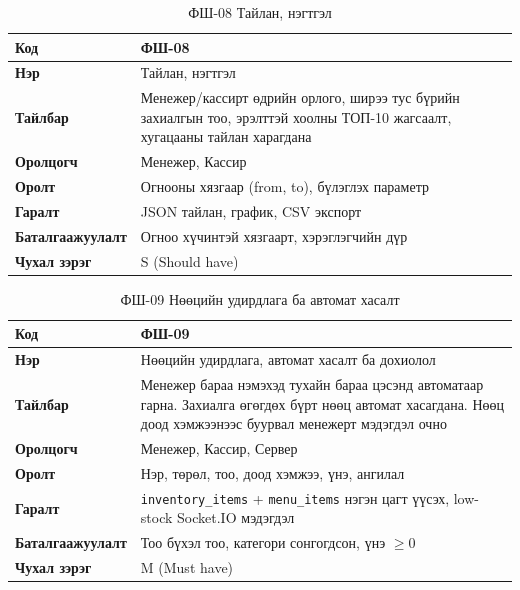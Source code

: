 \begin{table}[htbp]
\caption{ФШ-08 Тайлан, нэгтгэл}
\label{tab:fr08}
\centering
\small
\begin{tabularx}{\textwidth}{|l|L|}
\hline
{}
\textbf{Код} & ФШ-08 \\ \hline
\textbf{Нэр} & Тайлан, нэгтгэл \\ \hline
{}
\textbf{Тайлбар} & Менежер/кассирт өдрийн орлого, ширээ тус бүрийн захиалгын тоо, эрэлттэй хоолны ТОП-10 жагсаалт, хугацааны тайлан харагдана \\ \hline
\textbf{Оролцогч} & Менежер, Кассир \\ \hline
{}
\textbf{Оролт} & Огнооны хязгаар (from, to), бүлэглэх параметр \\ \hline
\textbf{Гаралт} & JSON тайлан, график, CSV экспорт \\ \hline
{}
\textbf{Баталгаажуулалт} & Огноо хүчинтэй хязгаарт, хэрэглэгчийн дүр \\ \hline
\textbf{Чухал зэрэг} & S (Should have) \\ \hline
\end{tabularx}
\end{table}

\begin{table}[htbp]
\caption{ФШ-09 Нөөцийн удирдлага ба автомат хасалт}
\label{tab:fr09}
\centering
\small
\begin{tabularx}{\textwidth}{|l|L|}
\hline
{}
\textbf{Код} & ФШ-09 \\ \hline
\textbf{Нэр} & Нөөцийн удирдлага, автомат хасалт ба дохиолол \\ \hline
{}
\textbf{Тайлбар} & Менежер бараа нэмэхэд тухайн бараа цэсэнд автоматаар гарна. Захиалга өгөгдөх бүрт нөөц автомат хасагдана. Нөөц доод хэмжээнээс буурвал менежерт мэдэгдэл очно \\ \hline
\textbf{Оролцогч} & Менежер, Кассир, Сервер \\ \hline
{}
\textbf{Оролт} & Нэр, төрөл, тоо, доод хэмжээ, үнэ, ангилал \\ \hline
\textbf{Гаралт} & \texttt{inventory\_items} + \texttt{menu\_items} нэгэн цагт үүсэх, low-stock Socket.IO мэдэгдэл \\ \hline
{}
\textbf{Баталгаажуулалт} & Тоо бүхэл тоо, категори сонгогдсон, үнэ $\geq 0$ \\ \hline
\textbf{Чухал зэрэг} & M (Must have) \\ \hline
\end{tabularx}
\end{table}

